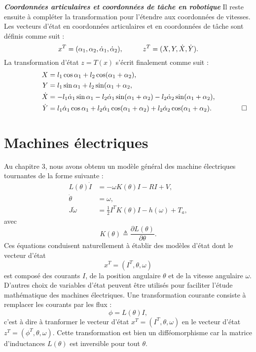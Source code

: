 \begin{exemple}{\bf \em Coordonnées articulaires et coordonnées 
de tâche en robotique}
Il reste ensuite à compléter la transformation pour l'étendre aux coordonnées
de vitesses.  Les vecteurs d'état en coordonnées articulaires et en
coordonnées de t\^ache sont définis comme suit : 
$$
x^T = (\alpha_1, \alpha_2, \dot \alpha_1, \dot\alpha_2), \hspace*{10mm} z^T
= (X,Y,\dot X, \dot Y).
$$
La transformation d'état $z = T(x)$ s'écrit finalement comme suit :
\begin{equation*} \begin{split}
X &= l_1 \cos\alpha_1 + l_2 \cos(\alpha_1 + \alpha_2),\\
Y&= l_1 \sin\alpha_1 + l_2 \sin(\alpha_1 + \alpha_2,\\
\dot X &=-l_1 \dot \alpha_1\sin\alpha_1 -l_2 \dot \alpha_1\sin(\alpha_1+\alpha_2) - l_2 \dot \alpha_2\sin(\alpha_1 + \alpha_2),\\
\dot Y &= l_1 \dot \alpha_1\cos\alpha_1 + l_2 \dot \alpha_1\cos(\alpha_1+\alpha_2) + l_2 \dot \alpha_2\cos(\alpha_1 + \alpha_2). \xqedhere{1.8cm}{\qed}
\end{split} \end{equation*}
\end{exemple}

\section{Machines électriques}

Au chapitre 3, nous avons obtenu un modèle  général des machine électriques tournantes de la forme suivante :
\begin{equation*} \begin{split}
L(\theta) \dot I &= -\omega K(\theta) I - RI +V, \\
\dot\theta &= \omega, \label{machel}\\
J \dot \omega &= \frac{1}{2}I^TK(\theta)I - h(\omega) + T_a, 
\end{split} \end{equation*}
avec
$$
K(\theta)\triangleq\frac{\partial L(\theta)}{\partial \theta}.
$$
Ces équations conduisent naturellement à établir des modèles d'état dont le
vecteur d'état
$$
x^T = (I^T, \theta, \omega)
$$
est composé des courants $I$, de la position angulaire $\theta$ et de la 
vitesse angulaire $\omega$.  D'autres choix de variables d'état peuvent être
utilisés pour faciliter l'étude mathématique des machines électriques.
Une transformation courante consiste à remplacer les courants par les flux :
$$
\phi = L(\theta)I,
$$
c'est à dire à tranformer le vecteur d'état $x^T = (I^T, \theta, \omega)$ en
le vecteur d'état $z^T = (\phi^T, \theta, \omega)$.  Cette transformation est bien un difféomorphisme car la matrice d'inductances
$L(\theta)$ est inversible pour tout $\theta$.

